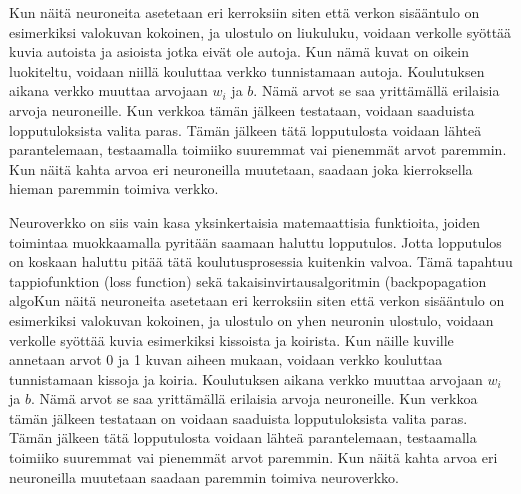 Kun näitä neuroneita asetetaan eri kerroksiin siten että verkon sisääntulo on esimerkiksi valokuvan kokoinen,
ja ulostulo on liukuluku,
voidaan verkolle syöttää kuvia autoista ja asioista jotka eivät ole autoja.
Kun nämä kuvat on oikein luokiteltu, voidaan niillä kouluttaa verkko tunnistamaan autoja.
Koulutuksen aikana verkko muuttaa arvojaan \(w_i\) ja \(b\).
Nämä arvot se saa yrittämällä erilaisia arvoja neuroneille.
Kun verkkoa tämän jälkeen testataan, voidaan saaduista lopputuloksista valita paras.
Tämän jälkeen tätä lopputulosta voidaan lähteä parantelemaan,
testaamalla toimiiko suuremmat vai pienemmät arvot paremmin.
Kun näitä kahta arvoa eri neuroneilla muutetaan,
saadaan joka kierroksella hieman paremmin toimiva verkko.

Neuroverkko on siis vain kasa yksinkertaisia matemaattisia funktioita,
joiden toimintaa muokkaamalla pyritään saamaan haluttu lopputulos.
Jotta lopputulos on koskaan haluttu pitää tätä koulutusprosessia kuitenkin valvoa.
Tämä tapahtuu tappiofunktion (loss function) sekä takaisinvirtausalgoritmin (backpopagation algoKun näitä neuroneita asetetaan eri kerroksiin siten että verkon sisääntulo on esimerkiksi valokuvan kokoinen, ja ulostulo on yhen neuronin ulostulo, voidaan verkolle syöttää kuvia esimerkiksi kissoista ja koirista. Kun näille kuville annetaan arvot 0 ja 1 kuvan aiheen mukaan, voidaan verkko kouluttaa tunnistamaan kissoja ja koiria. Koulutuksen aikana verkko muuttaa arvojaan \(w_i\) ja \(b\). Nämä arvot se saa yrittämällä erilaisia arvoja neuroneille. Kun verkkoa tämän jälkeen testataan on voidaan saaduista lopputuloksista valita paras. Tämän jälkeen tätä lopputulosta voidaan lähteä parantelemaan, testaamalla toimiiko suuremmat vai pienemmät arvot paremmin. Kun näitä kahta arvoa eri neuroneilla muutetaan saadaan paremmin toimiva neuroverkko.

